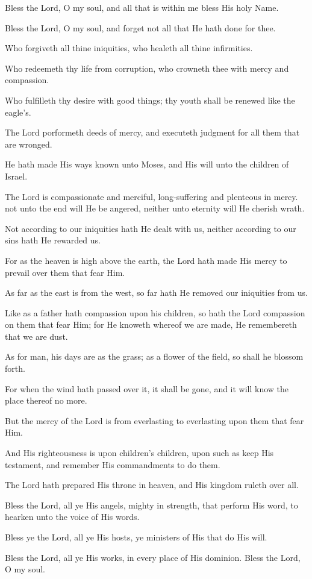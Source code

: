 Bless the Lord, O my soul, and all that is within me bless His holy Name.

Bless the Lord, O my soul, and forget not all that He hath done for thee.

Who forgiveth all thine iniquities, who healeth all thine infirmities.

Who redeemeth thy life from corruption, who crowneth thee with mercy and compassion.

Who fulfilleth thy desire with good things; thy youth shall be renewed like the eagle's.

The Lord porformeth deeds of mercy, and executeth judgment for all them that are wronged.

He hath made His ways known unto Moses, and His will unto the children of Israel.

The Lord is compassionate and merciful, long-suffering and plenteous in mercy. not unto the end will He be angered, neither unto eternity will He cherish wrath.

Not according to our iniquities hath He dealt with us, neither according to our sins hath He rewarded us.

For as the heaven is high above the earth, the Lord hath made His mercy to prevail over them that fear Him.

As far as the east is from the west, so far hath He removed our iniquities from us.

Like as a father hath compassion upon his children, so hath the Lord compassion on them that fear Him; for He knoweth whereof we are made, He remembereth that we are dust.

As for man, his days are as the grass; as a flower of the field, so shall he blossom forth.

For when the wind hath passed over it, it shall be gone, and it will know the place thereof no more.

But the mercy of the Lord is from everlasting to everlasting upon them that fear Him.

And His righteousness is upon children's children, upon such as keep His testament, and remember His commandments to do them.

The Lord hath prepared His throne in heaven, and His kingdom ruleth over all.

Bless the Lord, all ye His angels, mighty in strength, that perform His word, to hearken unto the voice of His words.

Bless ye the Lord, all ye His hosts, ye ministers of His that do His will.

Bless the Lord, all ye His works, in every place of His dominion. Bless the Lord, O my soul.
